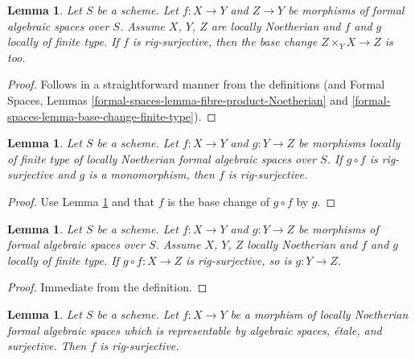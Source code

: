 \documentclass{stacks-project}
\theoremstyle{plain}
\newtheorem{lemma}[subsection]{Lemma}
\theoremstyle{definition}
\theoremstyle{remark}
\numberwithin{equation}{subsection}
\begin{document}
\begin{lemma}
\label{lemma-base-change-rig-surjective}
Let $S$ be a scheme. Let $f : X \to Y$ and $Z \to Y$ be morphisms
of formal algebraic spaces over $S$. Assume $X$, $Y$, $Z$ are locally
Noetherian and $f$ and $g$ locally of finite type. If $f$ is
rig-surjective, then the base change $Z \times_Y X \to Z$ is too.
\end{lemma}

\begin{proof}
Follows in a straightforward manner from the definitions (and
Formal Spaces, Lemmas \ref{formal-spaces-lemma-fibre-product-Noetherian} and
\ref{formal-spaces-lemma-base-change-finite-type}).
\end{proof}

\begin{lemma}
\label{lemma-rig-surjective-alternative-permanence}
Let $S$ be a scheme. Let $f : X \to Y$ and $g : Y \to Z$
be morphisms locally of finite type of locally Noetherian
formal algebraic spaces over $S$. If $g \circ f$ is rig-surjective
and $g$ is a monomorphism, then $f$ is rig-surjective.
\end{lemma}

\begin{proof}
Use Lemma \ref{lemma-base-change-rig-surjective} and that
$f$ is the base change of $g \circ f$ by $g$.
\end{proof}

\begin{lemma}
\label{lemma-permanence-rig-surjective}
Let $S$ be a scheme. Let $f : X \to Y$ and $g : Y \to Z$ be morphisms of
formal algebraic spaces over $S$. Assume $X$, $Y$, $Z$ locally Noetherian
and $f$ and $g$ locally of finite type. If $g \circ f : X \to Z$
is rig-surjective, so is $g : Y \to Z$.
\end{lemma}

\begin{proof}
Immediate from the definition.
\end{proof}

\begin{lemma}
\label{lemma-etale-covering-rig-surjective}
Let $S$ be a scheme. Let $f : X \to Y$ be a morphism of locally Noetherian
formal algebraic spaces which is representable by algebraic spaces, \'etale,
and surjective. Then $f$ is rig-surjective.
\end{lemma}
\end{document}

